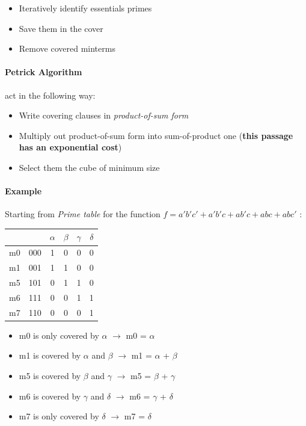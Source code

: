 \begin{itemize}
	\item Iteratively identify essentials primes
	\item Save them in the cover
	\item Remove covered minterms
\end{itemize}

\paragraph{Petrick Algorithm} act in the following way:

\begin{itemize}
	\item Write covering clauses in \textit{product-of-sum form}
	\item Multiply out product-of-sum form into sum-of-product one (\textbf{this passage has an exponential cost})
	\item Select them the cube of minimum size
\end{itemize}

\paragraph{Example} Starting from \textit{Prime table} for the function $ f= a'b'c' + a'b'c + ab'c + abc + abc' $ :
\bigskip

\begin{center}
	\begin{tabular}{|c c|c c c c|}
	\hline
	{} & {} & $\alpha$ & $\beta$ & $\gamma$ & $\delta$ \\ \hline
	m0 & 000 & 1 & 0 & 0 & 0 \\ \hline
	m1 & 001 & 1 & 1 & 0 & 0 \\ \hline
	m5 & 101 & 0 & 1 & 1 & 0 \\ \hline
	m6 & 111 & 0 & 0 & 1 & 1 \\ \hline
	m7 & 110 & 0 & 0 & 0 & 1 \\ \hline
	
\end{tabular}
\end{center}

\begin{itemize}
	\item m0 is only covered by $\alpha$ $ \rightarrow $ m0 = $\alpha$
	\item m1 is covered by $\alpha$ and $\beta$ $ \rightarrow $ m1 = $\alpha$ + $\beta$
	\item m5 is covered by $\beta$ and $\gamma$ $ \rightarrow $ m5 = $\beta$ + $\gamma$
	\item m6 is covered by $\gamma$ and $\delta$ $ \rightarrow $ m6 = $\gamma$ + $\delta$
	\item m7 is only covered by $\delta$ $ \rightarrow $ m7 = $\delta$\\
\end{itemize}

